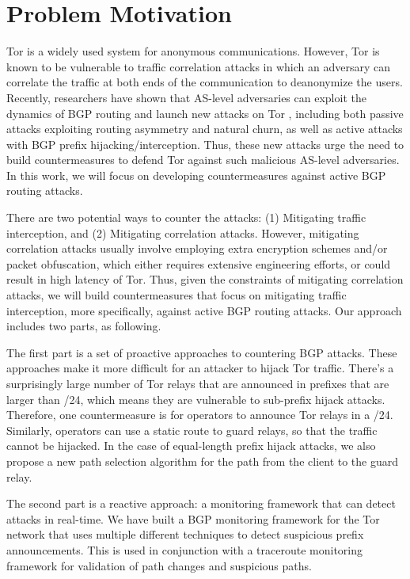 \section{Problem Motivation}

Tor is a widely used system for anonymous communications. However, Tor is known to be vulnerable to traffic correlation attacks in which an adversary can correlate the traffic at both ends of the communication to deanonymize the users. Recently, researchers have shown that AS-level adversaries can exploit the dynamics of BGP routing and launch new attacks on Tor \cite{sun2015raptor}, including both passive attacks exploiting routing asymmetry and natural churn, as well as active attacks with BGP prefix hijacking/interception. Thus, these new attacks urge the need to build countermeasures to defend Tor against such malicious AS-level adversaries. In this work, we will focus on developing countermeasures against active BGP routing attacks. 

There are two potential ways to counter the attacks: (1) Mitigating traffic interception, and (2) Mitigating correlation attacks. However, mitigating correlation attacks usually involve employing extra encryption schemes and/or packet obfuscation, which either requires extensive engineering efforts, or could result in high latency of Tor. Thus, given the constraints of mitigating correlation attacks, we will build countermeasures that focus on mitigating traffic interception, more specifically, against active BGP routing attacks. Our approach includes two parts, as following. 

The first part is a set of proactive approaches to countering BGP attacks.  These approaches make it more difficult for an attacker to hijack Tor traffic.  There's a surprisingly large number of Tor relays that are announced in prefixes that are larger than /24, which means they are vulnerable to sub-prefix hijack attacks.  Therefore, one countermeasure is for operators to announce Tor relays in a /24.  Similarly, operators can use a static route to guard relays, so that the traffic cannot be hijacked.  In the case of equal-length prefix hijack attacks, we also propose a new path selection algorithm for the path from the client to the guard relay.  

The second part is a reactive approach: a monitoring framework that can detect attacks in real-time.  We have built a BGP monitoring framework for the Tor network that uses multiple different techniques to detect suspicious prefix announcements.  This is used in conjunction with a traceroute monitoring framework for validation of path changes and suspicious paths.  

